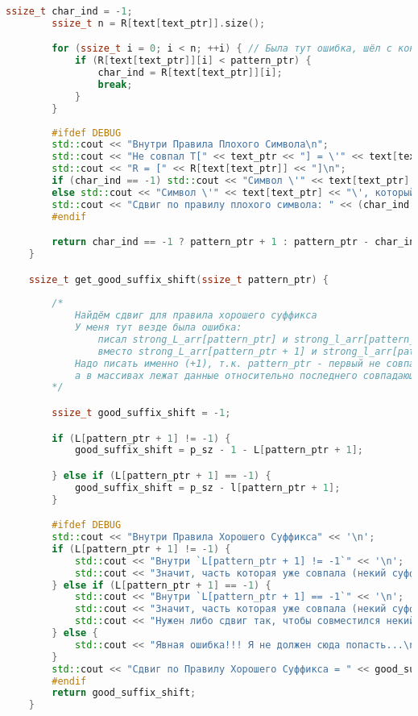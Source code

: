 \begin{lstlisting}[language=C++]
        ssize_t char_ind = -1;
        ssize_t n = R[text[text_ptr]].size();

        for (ssize_t i = 0; i < n; ++i) { // Была тут ошибка, шёл с конца
            if (R[text[text_ptr]][i] < pattern_ptr) {
                char_ind = R[text[text_ptr]][i];
                break;
            }
        }
    
        #ifdef DEBUG
        std::cout << "Внутри Правила Плохого Символа\n";
        std::cout << "Не совпал T[" << text_ptr << "] = \'" << text[text_ptr] << "\' И P[" << pattern_ptr << "] = \'" << pattern[pattern_ptr] << "\'\n";
        std::cout << "R = [" << R[text[text_ptr]] << "]\n";
        if (char_ind == -1) std::cout << "Символ \'" << text[text_ptr] << "\', который будет левее " << pattern_ptr << " не найден" << '\n';
        else std::cout << "Символ \'" << text[text_ptr] << "\', который будет левее " << pattern_ptr << " располагается на " << char_ind << '\n';
        std::cout << "Сдвиг по правилу плохого символа: " << (char_ind == -1 ? pattern_ptr + 1 : pattern_ptr - char_ind) << "\n\n\n" << std::endl;
        #endif

        return char_ind == -1 ? pattern_ptr + 1 : pattern_ptr - char_ind;
    }

    ssize_t get_good_suffix_shift(ssize_t pattern_ptr) {
        
        /*
            Найдём сдвиг для правила хорошего суффикса
            У меня тут везде была ошибка:
                писал strong_L_arr[pattern_ptr] и strong_l_arr[pattern_ptr]
                вместо strong_L_arr[pattern_ptr + 1] и strong_l_arr[pattern_ptr + 1]
            Надо писать именно (+1), т.к. pattern_ptr - первый не совпадающий символ,
            а в массивах лежат данные относительно последнего совпадающего.
        */

        ssize_t good_suffix_shift = -1;

        if (L[pattern_ptr + 1] != -1) {
            good_suffix_shift = p_sz - 1 - L[pattern_ptr + 1];

        } else if (L[pattern_ptr + 1] == -1) {
            good_suffix_shift = p_sz - l[pattern_ptr + 1];
        }

        #ifdef DEBUG
        std::cout << "Внутри Правила Хорошего Суффикса" << '\n';
        if (L[pattern_ptr + 1] != -1) {
            std::cout << "Внутри `L[pattern_ptr + 1] != -1`" << '\n';
            std::cout << "Значит, часть которая уже совпала (некий суффикс P), найдена левее pattern_ptr`\n";
        } else if (L[pattern_ptr + 1] == -1) {
            std::cout << "Внутри `L[pattern_ptr + 1] == -1`" << '\n';
            std::cout << "Значит, часть которая уже совпала (некий суффикс P), НЕнайдена левее pattern_ptr`\n";
            std::cout << "Нужен либо сдвиг так, чтобы совместился некий префикс P с суффиксом уже совпавщей части в T, либо pattern будет сдвинут полностью\n";
        } else {
            std::cout << "Явная ошибка!!! Я не должен сюда попасть...\n";
        }
        std::cout << "Сдвиг по Правилу Хорошего Суффикса = " << good_suffix_shift << "\n\n\n" << std::endl;
        #endif
        return good_suffix_shift;
    }


\end{lstlisting}

